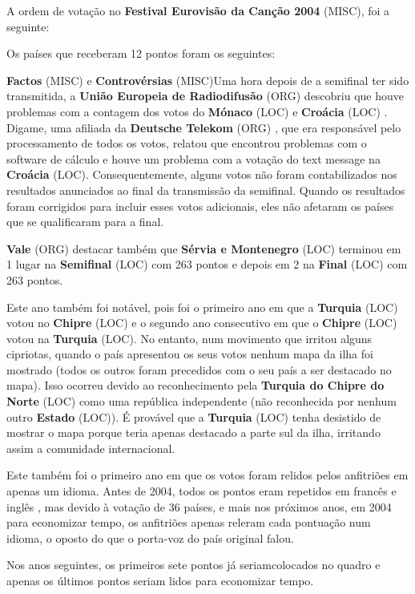 \documentclass[12pt,a4paper]{article}
\begin{document}
A ordem de votação no \textbf{Festival Eurovisão da Canção 2004} (MISC), foi a seguinte:

Os países que receberam 12 pontos foram os seguintes:



\textbf{Factos} (MISC) e \textbf{Controvérsias} (MISC)Uma hora depois de a semifinal ter sido transmitida, a \textbf{União Europeia de Radiodifusão} (ORG) descobriu que houve problemas com a contagem dos votos do \textbf{Mónaco} (LOC) e \textbf{Croácia} (LOC) . Digame, uma afiliada da \textbf{Deutsche Telekom} (ORG) , que era responsável pelo processamento de todos os votos, relatou que encontrou problemas com o software de cálculo e houve um problema com a votação do text message na \textbf{Croácia} (LOC). Consequentemente, alguns votos não foram contabilizados nos resultados anunciados ao final da transmissão da semifinal. Quando os resultados foram corrigidos para incluir esses votos adicionais, eles não afetaram os países que se qualificaram para a final.

\textbf{Vale} (ORG) destacar também que \textbf{Sérvia e Montenegro} (LOC) terminou em 1 lugar na \textbf{Semifinal} (LOC) com 263 pontos e depois em 2 na \textbf{Final} (LOC) com 263 pontos.

Este ano também foi notável, pois foi o primeiro ano em que a \textbf{Turquia} (LOC) votou no \textbf{Chipre} (LOC) e o segundo ano consecutivo em que o \textbf{Chipre} (LOC) votou na \textbf{Turquia} (LOC). No entanto, num movimento que irritou alguns cipriotas, quando o país apresentou os seus votos nenhum mapa da ilha foi mostrado (todos os outros foram precedidos com o seu país a ser destacado no mapa). Isso ocorreu devido ao reconhecimento pela \textbf{Turquia do Chipre do Norte} (LOC) como uma república independente (não reconhecida por nenhum outro \textbf{Estado} (LOC)). É provável que a \textbf{Turquia} (LOC) tenha desistido de mostrar o mapa porque teria apenas destacado a parte sul da ilha, irritando assim a comunidade internacional.

Este também foi o primeiro ano em que os votos foram relidos pelos anfitriões em apenas um idioma. Antes de 2004, todos os pontos eram repetidos em francês e inglês , mas devido à votação de 36 países, e mais nos próximos anos, em 2004 para economizar tempo, os anfitriões apenas releram cada pontuação num idioma, o oposto do que o porta-voz do país original falou.

Nos anos seguintes, os primeiros sete pontos já seriamcolocados no quadro e apenas os últimos pontos seriam lidos para economizar tempo.
\end{document}
